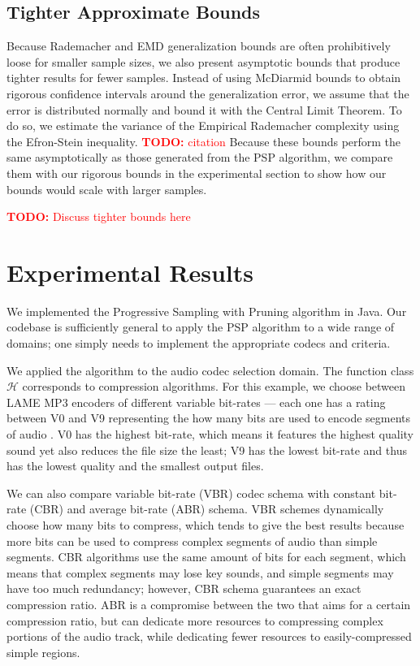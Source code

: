 \documentclass{article}
\newcommand\todo[1]{\textcolor{red}{\textbf{TODO:} #1}}
\begin{document}
{\subsection{Tighter Approximate Bounds}
Because Rademacher and EMD generalization bounds are often prohibitively loose for smaller sample sizes, we also present asymptotic bounds that produce tighter results for fewer samples. Instead of using McDiarmid bounds to obtain rigorous confidence intervals around the generalization error, we assume that the error is distributed normally and bound it with the Central Limit Theorem. To do so, we estimate the variance of the Empirical Rademacher complexity using the Efron-Stein inequality. \todo{citation} Because these bounds perform the same asymptotically as those generated from the PSP algorithm, we compare them with our rigorous bounds in the experimental section to show how our bounds would scale with larger samples.  

\todo{Discuss tighter bounds here}

\section{Experimental Results}
We implemented the Progressive Sampling with Pruning algorithm in Java. Our codebase is sufficiently general to apply the PSP algorithm to a wide range of domains; one simply needs to implement the appropriate codecs and criteria.

We applied the algorithm to the audio codec selection domain. The function class $\mathcal{H}$ corresponds to compression algorithms. For this example, we choose between LAME MP3 encoders of different variable bit-rates --- each one has a rating between V0 and V9 representing the how many bits are used to encode segments of audio \citep{lame}. V0 has the highest bit-rate, which means it features the highest quality sound yet also reduces the file size the least; V9 has the lowest bit-rate and thus has the lowest quality and the smallest output files.

We can also compare variable bit-rate (VBR) codec schema with constant bit-rate (CBR) and average bit-rate (ABR) schema. VBR schemes dynamically choose how many bits to compress, which tends to give the best results because more bits can be used to compress complex segments of audio than simple segments. CBR algorithms use the same amount of bits for each segment, which means that complex segments may lose key sounds, and simple segments may have too much redundancy; however, CBR schema guarantees an exact compression ratio. ABR is a compromise between the two that aims for a certain compression ratio, but can dedicate more resources to compressing complex portions of the audio track, while dedicating fewer resources to easily-compressed simple regions.

}
\end{document}
